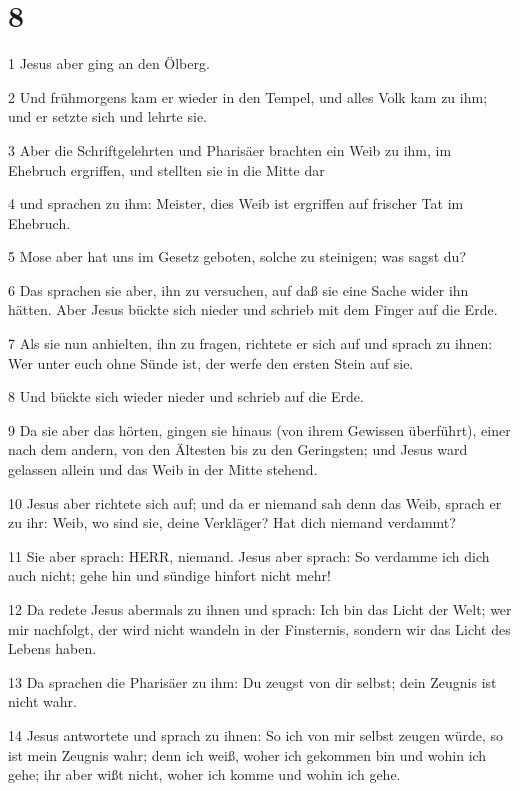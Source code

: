 \chapter{8}

\par 1 Jesus aber ging an den Ölberg.
\par 2 Und frühmorgens kam er wieder in den Tempel, und alles Volk kam zu ihm; und er setzte sich und lehrte sie.
\par 3 Aber die Schriftgelehrten und Pharisäer brachten ein Weib zu ihm, im Ehebruch ergriffen, und stellten sie in die Mitte dar
\par 4 und sprachen zu ihm: Meister, dies Weib ist ergriffen auf frischer Tat im Ehebruch.
\par 5 Mose aber hat uns im Gesetz geboten, solche zu steinigen; was sagst du?
\par 6 Das sprachen sie aber, ihn zu versuchen, auf daß sie eine Sache wider ihn hätten. Aber Jesus bückte sich nieder und schrieb mit dem Finger auf die Erde.
\par 7 Als sie nun anhielten, ihn zu fragen, richtete er sich auf und sprach zu ihnen: Wer unter euch ohne Sünde ist, der werfe den ersten Stein auf sie.
\par 8 Und bückte sich wieder nieder und schrieb auf die Erde.
\par 9 Da sie aber das hörten, gingen sie hinaus (von ihrem Gewissen überführt), einer nach dem andern, von den Ältesten bis zu den Geringsten; und Jesus ward gelassen allein und das Weib in der Mitte stehend.
\par 10 Jesus aber richtete sich auf; und da er niemand sah denn das Weib, sprach er zu ihr: Weib, wo sind sie, deine Verkläger? Hat dich niemand verdammt?
\par 11 Sie aber sprach: HERR, niemand. Jesus aber sprach: So verdamme ich dich auch nicht; gehe hin und sündige hinfort nicht mehr!
\par 12 Da redete Jesus abermals zu ihnen und sprach: Ich bin das Licht der Welt; wer mir nachfolgt, der wird nicht wandeln in der Finsternis, sondern wir das Licht des Lebens haben.
\par 13 Da sprachen die Pharisäer zu ihm: Du zeugst von dir selbst; dein Zeugnis ist nicht wahr.
\par 14 Jesus antwortete und sprach zu ihnen: So ich von mir selbst zeugen würde, so ist mein Zeugnis wahr; denn ich weiß, woher ich gekommen bin und wohin ich gehe; ihr aber wißt nicht, woher ich komme und wohin ich gehe.
